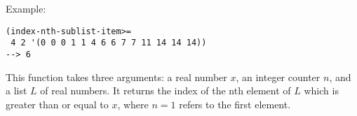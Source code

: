 \vspace{0.5cm}
\noindent Example:
\begin{verbatim}
(index-nth-sublist-item>=
 4 2 '(0 0 0 1 1 4 6 6 7 7 11 14 14 14))
--> 6
\end{verbatim}

\noindent This function takes three arguments: a real
number $x$, an integer counter $n$, and a list $L$ of
real numbers. It returns the index of the nth element
of $L$ which is greater than or equal to $x$, where
$n = 1$ refers to the first element.
